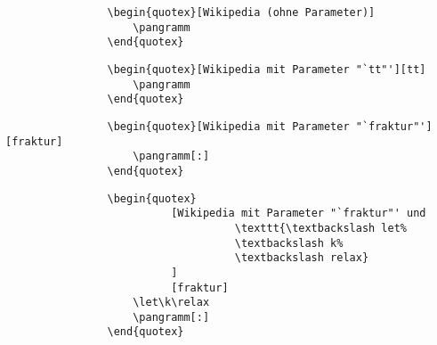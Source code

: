 			\begin{verbatim}
				\begin{quotex}[Wikipedia (ohne Parameter)]
				    \pangramm
				\end{quotex}
			\end{verbatim}


			\begin{verbatim}
				\begin{quotex}[Wikipedia mit Parameter "`tt"'][tt]
				    \pangramm
				\end{quotex}
			\end{verbatim}


			\begin{verbatim}
				\begin{quotex}[Wikipedia mit Parameter "`fraktur"'][fraktur]
				    \pangramm[:]
				\end{quotex}
			\end{verbatim}


			\begin{verbatim}
				\begin{quotex}
				          [Wikipedia mit Parameter "`fraktur"' und
					                \texttt{\textbackslash let%
					                \textbackslash k%
					                \textbackslash relax}
					      ]
				          [fraktur]
				    \let\k\relax
				    \pangramm[:]
				\end{quotex}
			\end{verbatim}

